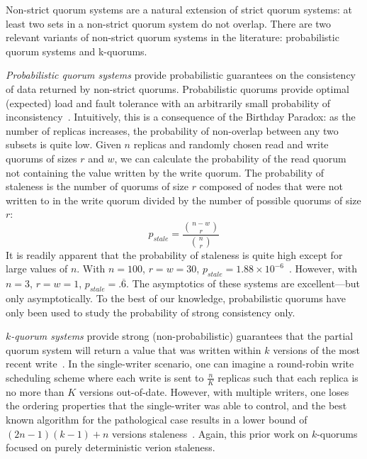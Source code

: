 \documentclass{vldb}
\begin{document}
Non-strict quorum systems are a natural extension of strict quorum
systems: at least two sets in a non-strict quorum system do not
overlap.  There are two relevant variants of non-strict quorum systems in
the literature: probabilistic quorum systems and k-quorums.

\textit{Probabilistic quorum systems} provide probabilistic guarantees
on the consistency of data returned by non-strict quorums.
Probabilistic quorums provide optimal (expected) load and fault
tolerance with an arbitrarily small probability of
inconsistency~\cite{prob-quorum}.  Intuitively, this is a consequence
of the Birthday Paradox: as the number of replicas increases, the
probability of non-overlap between any two subsets is quite low.
Given $n$ replicas and randomly chosen read and write quorums of sizes
$r$ and $w$, we can calculate the probability of the read quorum not
containing the value written by the write quorum.  The probability of
staleness is the number of quorums of size $r$ composed of nodes that
were not written to in the write quorum divided by the number of
possible quorums of size $r$:
\begin{equation}
\label{eq:prob-strict}
p_{stale}=\frac{{n-w \choose r}}{{n \choose r}}
\end{equation}
It is readily apparent that the probability of staleness is quite high
except for large values of $n$.  With $n=100$, $r=w=30$, $p_{stale} =
1.88 \times 10^{-6}$~\cite{nonstrict-availability}.  However, with
$n=3$, $r=w=1$, $p_{stale} = .\overline{6}$.  The asymptotics of these
systems are excellent---but only asymptotically.  To the best of our
knowledge, probabilistic quorums have only been used to study the
probability of strong consistency only.

\textit{$k$-quorum systems} provide strong (non-probabilistic)
guarantees that the partial quorum system will return a value that was
written within $k$ versions of the most recent
write~\cite{nonstrict-availability}.  In the single-writer scenario,
one can imagine a round-robin write scheduling scheme where each write
is sent to $\frac{n}{K}$ replicas such that each replica is no more
than $K$ versions out-of-date.  However, with multiple writers, one
loses the ordering properties that the single-writer was able to
control, and the best known algorithm for the pathological case
results in a lower bound of $(2n-1)(k-1)+n$ versions staleness~\cite{k-quorum-lb}.
Again, this prior work on $k$-quorums focused on purely deterministic
verion staleness.
\end{document}
